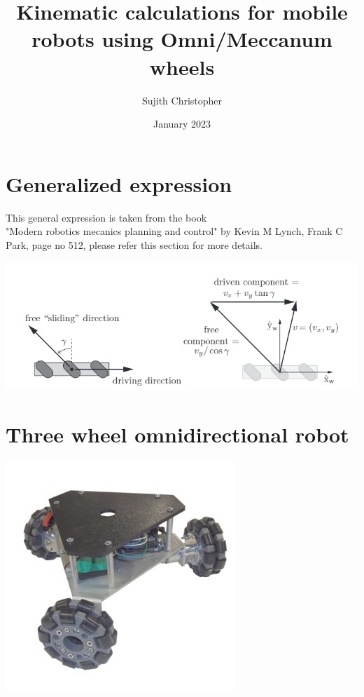 \documentclass{article}
\title{\textbf{Kinematic calculations for mobile robots using Omni/Meccanum wheels}}
\author{Sujith Christopher}
\date{January 2023}
\begin{document}
\maketitle

\section{Generalized expression}

\begin{large}
    This general expression is taken from the book \\
    "Modern robotics mecanics planning and control" by Kevin M Lynch, Frank C Park,
    page no 512, please refer this section for more details.
\end{large}


\includegraphics{omni_wheel_kinematics_2.png}
\section{Three wheel omnidirectional robot}
\includegraphics{robot_3_omniwheel.jpg}
\end{document}
